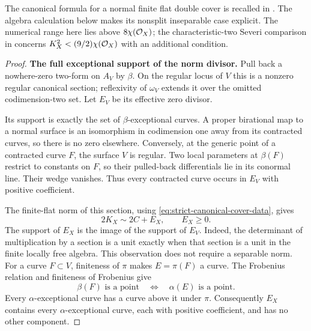 The canonical formula for a normal finite flat double cover is
recalled in \cite[Section~2.2, equations~(2.9)--(2.15),
pp.~8--9]{ContiPositiveSeveriComparison}.
The algebra calculation below makes its nonsplit inseparable case
explicit. The numerical range here lies above
$8\chi(\mathcal O_X)$; the characteristic-two Severi comparison in
\cite[Theorem~8.4, p.~51]{ContiPositiveSeveriComparison} concerns
$K_X^2<(9/2)\chi(\mathcal O_X)$ with an additional condition.

\begin{proof}
\par\smallskip\noindent\textbf{The full exceptional support of the norm divisor.}
Pull back a nowhere-zero two-form on $A_V$ by $\beta$.  On the
regular locus of $V$ this is a nonzero regular canonical section;
reflexivity of $\omega_V$ extends it over the omitted
codimension-two set.  Let $E_V$ be its effective zero divisor.

Its support is exactly the set of $\beta$-exceptional curves.
A proper birational map to a normal surface is an isomorphism
in codimension one away from its contracted curves, so there is
no zero elsewhere.  Conversely, at the generic point of a
contracted curve $F$, the surface $V$ is regular.  Two local
parameters at $\beta(F)$ restrict to constants on $F$, so their
pulled-back differentials lie in its conormal line.  Their wedge
vanishes.  Thus every contracted curve occurs in $E_V$ with
positive coefficient.

The finite-flat norm of this section, using
\eqref{eq:strict-canonical-cover-data}, gives
\begin{equation}\label{eq:strict-canonical-full-support-norm}
 2K_X\sim2C+E_X,\qquad E_X\ge0.
\end{equation}
The support of $E_X$ is the image of the support of $E_V$.
Indeed, the determinant of multiplication by a section is a unit
exactly when that section is a unit in the finite locally free
algebra.  This observation does not require a separable norm.
For a curve $F\subset V$, finiteness of $\pi$ makes
$E=\pi(F)$ a curve.  The Frobenius relation and finiteness of
Frobenius give
\[
 \beta(F)\text{ is a point}
 \quad\Longleftrightarrow\quad
 \alpha(E)\text{ is a point}.
\]
Every $\alpha$-exceptional curve has a curve above it under $\pi$.
Consequently $E_X$ contains every $\alpha$-exceptional curve,
each with positive coefficient, and has no other component.


\end{proof}
